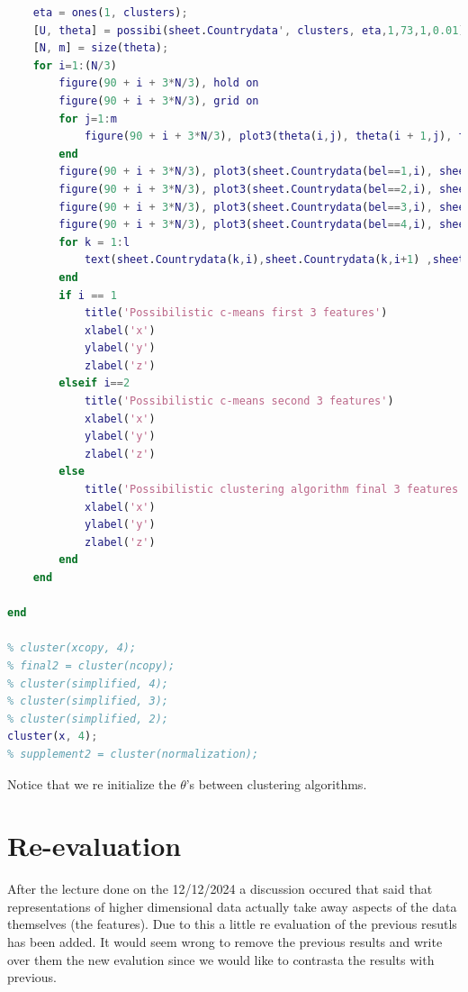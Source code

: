 \documentclass[12pt, a4paper]{article}
\begin{document}
\begin{lstlisting}[language=Matlab, label=lst:final, caption=The entire code as it was upon completion.]
    % Possibilistic
    eta = ones(1, clusters);
    [U, theta] = possibi(sheet.Countrydata', clusters, eta,1,73,1,0.01);
    [N, m] = size(theta);
    for i=1:(N/3)
        figure(90 + i + 3*N/3), hold on
        figure(90 + i + 3*N/3), grid on
        for j=1:m
            figure(90 + i + 3*N/3), plot3(theta(i,j), theta(i + 1,j), theta(i + 2,j), 'k+')
        end
        figure(90 + i + 3*N/3), plot3(sheet.Countrydata(bel==1,i), sheet.Countrydata(bel==1, i+ 1), sheet.Countrydata(bel==1,i+2), 'ro')
        figure(90 + i + 3*N/3), plot3(sheet.Countrydata(bel==2,i), sheet.Countrydata(bel==2, i+ 1), sheet.Countrydata(bel==2,i+2), 'g*')
        figure(90 + i + 3*N/3), plot3(sheet.Countrydata(bel==3,i), sheet.Countrydata(bel==3, i+ 1), sheet.Countrydata(bel==3,i+2), 'b.')
        figure(90 + i + 3*N/3), plot3(sheet.Countrydata(bel==4,i), sheet.Countrydata(bel==4, i+ 1), sheet.Countrydata(bel==4,i+2), 'ys')
        for k = 1:l
            text(sheet.Countrydata(k,i),sheet.Countrydata(k,i+1) ,sheet.Countrydata(k,i+2) , sheet.country(k), 'FontSize', 8, 'HorizontalAlignment', 'left')
        end
        if i == 1
            title('Possibilistic c-means first 3 features')
            xlabel('x')
            ylabel('y')
            zlabel('z')
        elseif i==2
            title('Possibilistic c-means second 3 features')
            xlabel('x')
            ylabel('y')
            zlabel('z')
        else
            title('Possibilistic clustering algorithm final 3 features')
            xlabel('x')
            ylabel('y')
            zlabel('z')
        end
    end

end

% cluster(xcopy, 4);
% final2 = cluster(ncopy);
% cluster(simplified, 4);
% cluster(simplified, 3);
% cluster(simplified, 2);
cluster(x, 4);
% supplement2 = cluster(normalization);
\end{lstlisting}
Notice that we re initialize the $\theta$'s between clustering algorithms.

\section{Re-evaluation}

After the lecture done on the 12/12/2024 a discussion occured that said that representations of higher dimensional data actually take away aspects of the data themselves (the features). Due to this a little re evaluation of the previous resutls has been added. It would seem wrong to remove the previous results and write over them the new evalution since we would like to contrasta the results with previous.
\newline
\end{document}
